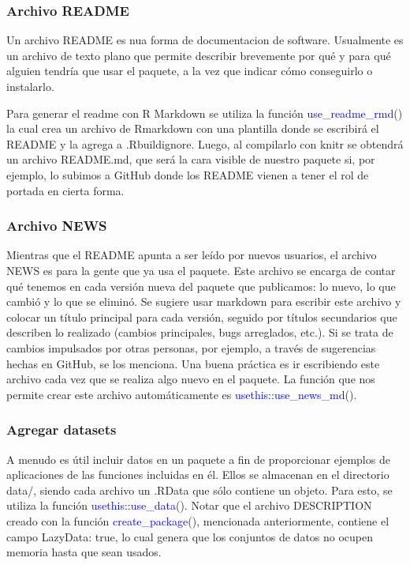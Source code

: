 \subsubsection{Archivo README}

Un archivo README es nua forma de documentacion de software. Usualmente es un archivo de texto plano que permite describir brevemente por qué y para qué alguien tendría que usar el paquete, a la vez que indicar cómo conseguirlo o instalarlo.

Para generar el readme con R Markdown se utiliza la función \textcolor{blue}{use\_readme\_rmd}() la cual crea un archivo de Rmarkdown con una plantilla donde se escribirá el README y la agrega a .Rbuildignore. Luego, al compilarlo con knitr se obtendrá un archivo README.md, que será la cara visible de nuestro paquete si, por ejemplo, lo subimos a GitHub donde los README vienen a tener el rol de portada en cierta forma.


\subsubsection{Archivo NEWS}


Mientras que el README apunta a ser leído por nuevos usuarios, el archivo NEWS es para la gente que ya usa el paquete.
Este archivo se encarga de contar qué tenemos en cada versión nueva del paquete que publicamos: lo nuevo, lo que cambió y lo que se eliminó.
Se sugiere usar markdown para escribir este archivo y colocar un título principal para cada versión, seguido por títulos secundarios que describen lo realizado (cambios principales, bugs arreglados, etc.).
Si se trata de cambios impulsados por otras personas, por ejemplo, a través de sugerencias hechas en GitHub, se los menciona.
Una buena práctica es ir escribiendo este archivo cada vez que se realiza algo nuevo en el paquete.
La función que nos permite crear este archivo automáticamente es
\textcolor{blue}{usethis::use\_news\_md}(). 


\subsubsection{Agregar datasets}

A menudo es útil incluir datos en un paquete a fin de proporcionar ejemplos de aplicaciones de las funciones incluidas en él. Ellos se almacenan en el directorio data/, siendo cada archivo un .RData que sólo contiene un objeto. Para esto, se utiliza la función \textcolor{blue}{usethis::use\_data}(). Notar que el archivo DESCRIPTION creado con la función \textcolor{blue}{create\_package}(), mencionada anteriormente, contiene el campo LazyData: true, lo cual genera que los conjuntos de datos no ocupen memoria hasta que sean usados.

